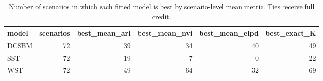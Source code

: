 \begin{table}

\caption{Number of scenarios in which each fitted model is best by scenario-level mean metric. Ties receive full credit.}
\centering
\begin{tabular}[t]{lrrrrr}
\toprule
model & scenarios & best_mean_ari & best_mean_nvi & best_mean_elpd & best_exact_K\\
\midrule
DCSBM & 72 & 39 & 34 & 40 & 49\\
SST & 72 & 19 & 7 & 0 & 22\\
WST & 72 & 49 & 64 & 32 & 69\\
\bottomrule
\end{tabular}
\end{table}
